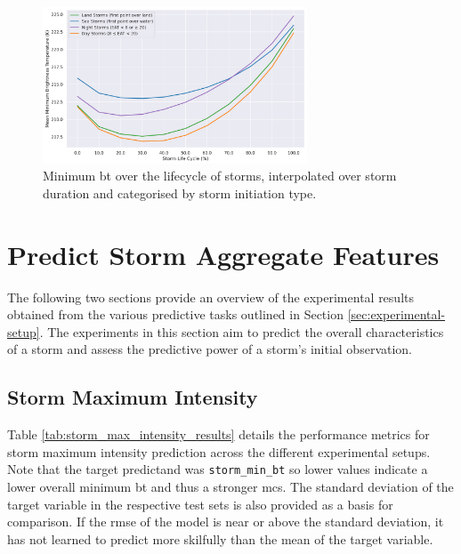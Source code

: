 \begin{figure}[ht]
    \centering
    \includegraphics[width=0.7\textwidth]{../figures/generated/exploration/min_bt_over_lifecycle_by_init_type.png}
    \caption{Minimum \acrfull{bt} over the lifecycle of storms, interpolated over storm duration and categorised by storm initiation type.}
    \label{fig:min_bt_over_lifecycle_by_init_type}
\end{figure}

\section{Predict Storm Aggregate Features}

The following two sections provide an overview of the experimental results obtained from the various predictive tasks outlined in Section \ref{sec:experimental-setup}. The experiments in this section aim to predict the overall characteristics of a storm and assess the predictive power of a storm's initial observation.

\subsection{Storm Maximum Intensity}

Table \ref{tab:storm_max_intensity_results} details the performance metrics for storm maximum intensity prediction across the different experimental setups. Note that the target predictand was \texttt{storm\_min\_bt} so lower values indicate a lower overall minimum \acrshort{bt} and thus a stronger \acrshort{mcs}. The standard deviation of the target variable in the respective test sets is also provided as a basis for comparison. If the \acrshort{rmse} of the model is near or above the standard deviation, it has not learned to predict more skilfully than the mean of the target variable.

